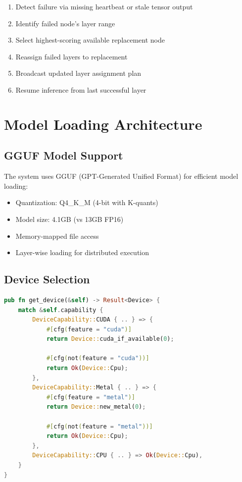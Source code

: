 \documentclass[12pt,a4paper]{article}
\begin{document}
\begin{enumerate}
    \item Detect failure via missing heartbeat or stale tensor output
    \item Identify failed node's layer range
    \item Select highest-scoring available replacement node
    \item Reassign failed layers to replacement
    \item Broadcast updated layer assignment plan
    \item Resume inference from last successful layer
\end{enumerate}

\section{Model Loading Architecture}

\subsection{GGUF Model Support}

The system uses GGUF (GPT-Generated Unified Format) for efficient model loading:

\begin{itemize}
    \item Quantization: Q4\_K\_M (4-bit with K-quants)
    \item Model size: 4.1GB (vs 13GB FP16)
    \item Memory-mapped file access
    \item Layer-wise loading for distributed execution
\end{itemize}

\subsection{Device Selection}

\begin{lstlisting}[language=Rust, caption=Device Selection Logic]
pub fn get_device(&self) -> Result<Device> {
    match &self.capability {
        DeviceCapability::CUDA { .. } => {
            #[cfg(feature = "cuda")]
            return Device::cuda_if_available(0);

            #[cfg(not(feature = "cuda"))]
            return Ok(Device::Cpu);
        },
        DeviceCapability::Metal { .. } => {
            #[cfg(feature = "metal")]
            return Device::new_metal(0);

            #[cfg(not(feature = "metal"))]
            return Ok(Device::Cpu);
        },
        DeviceCapability::CPU { .. } => Ok(Device::Cpu),
    }
}
\end{lstlisting}
\end{document}
